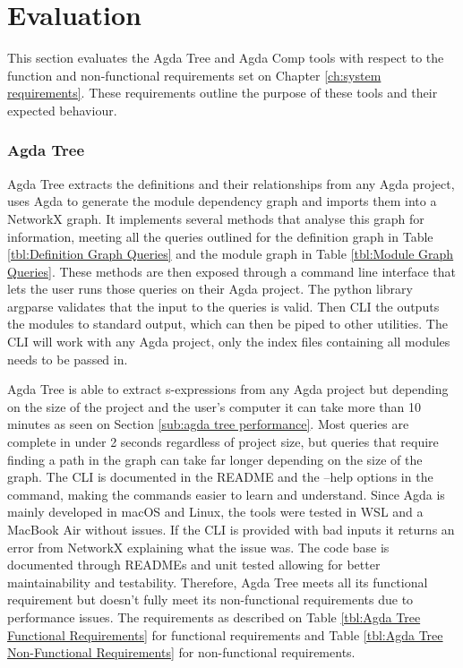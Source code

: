 
\chapter{Evaluation}

This section evaluates the Agda Tree and Agda Comp tools with respect to the
function and non-functional requirements set on Chapter \ref{ch:system
requirements}. These requirements outline the purpose of these tools and their
expected behaviour.

\subsection{Agda Tree} \label{sub:eval agda tree}

Agda Tree extracts the definitions and their relationships from any Agda
project, uses Agda to generate the module dependency graph and imports them
into a NetworkX graph. It implements several methods that analyse this
graph for information, meeting all the queries outlined for the definition
graph in Table \ref{tbl:Definition Graph Queries} and the module graph in Table
\ref{tbl:Module Graph Queries}. These methods are then exposed through a
command line interface that lets the user runs those queries on their Agda
project. The python library argparse validates that the input to the queries is
valid. Then CLI the outputs the modules to standard output, which can then be
piped to other utilities. The CLI will work with any Agda project, only the
index files containing all modules needs to be passed in. 

Agda Tree is able to extract s-expressions from any Agda project but depending
on the size of the project and the user's computer it can take more than 10
minutes as seen on Section \ref{sub:agda tree performance}. Most queries are
complete in under 2 seconds regardless of project size, but queries that
require finding a path in the graph can take far longer depending on the size
of the graph. The CLI is documented in the README and the \textsf{--help}
options in the command, making the commands easier to learn and understand.
Since Agda is mainly developed in macOS and Linux, the tools were tested in WSL
and a MacBook Air without issues. If the CLI is provided with bad inputs it
returns an error from NetworkX explaining what the issue was. The code base is
documented through READMEs and unit tested allowing for better maintainability
and testability. Therefore, Agda Tree meets all its functional requirement but
doesn't fully meet its non-functional requirements due to performance issues.
The requirements as described on Table \ref{tbl:Agda Tree Functional Requirements} for functional requirements and Table \ref{tbl:Agda Tree Non-Functional Requirements} for non-functional requirements.

